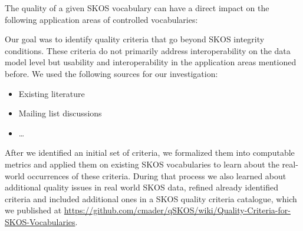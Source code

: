 
The quality of a given SKOS vocabulary can have a direct impact on the following application areas of controlled vocabularies: 




Our goal was to identify quality criteria that go beyond SKOS integrity conditions. These criteria do not primarily address interoperability on the data model level but usability and interoperability in the application areas mentioned before. We used the following sources for our investigation:

\begin{itemize}
    \item Existing literature
    \item Mailing list discussions
    \item \ldots
\end{itemize}

After we identified an initial set of criteria, we formalized them into computable metrics and applied them on existing SKOS vocabularies to learn about the real-world occurrences of these criteria. During that process we also learned about additional quality issues in real world SKOS data, refined already identified criteria and included additional ones in a SKOS quality criteria catalogue, which we published at \url{https://github.com/cmader/qSKOS/wiki/Quality-Criteria-for-SKOS-Vocabularies}.




